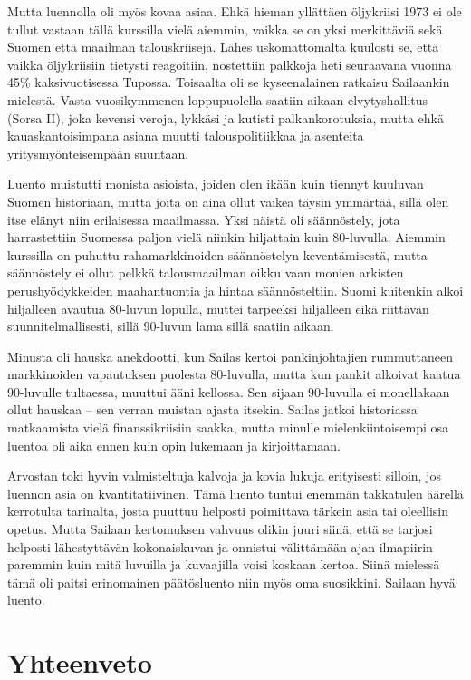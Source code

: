 \documentclass[12pt]{article}
\begin{document}
Mutta luennolla oli myös kovaa asiaa. Ehkä hieman yllättäen öljykriisi 1973 ei ole tullut vastaan tällä kurssilla vielä aiemmin, vaikka se on yksi merkittäviä sekä Suomen että maailman talouskriisejä. Lähes uskomattomalta kuulosti se, että vaikka öljykriisiin tietysti reagoitiin, nostettiin palkkoja heti seuraavana vuonna 45\% kaksivuotisessa Tupossa. Toisaalta oli se kyseenalainen ratkaisu Sailaankin mielestä. Vasta vuosikymmenen loppupuolella saatiin aikaan elvytyshallitus (Sorsa II), joka kevensi veroja, lykkäsi ja kutisti palkankorotuksia, mutta ehkä kauaskantoisimpana asiana muutti talouspolitiikkaa ja asenteita yritysmyönteisempään suuntaan.

Luento muistutti monista asioista, joiden olen ikään kuin tiennyt kuuluvan Suomen historiaan, mutta joita on aina ollut vaikea täysin ymmärtää, sillä olen itse elänyt niin erilaisessa maailmassa. Yksi näistä oli säännöstely, jota harrastettiin Suomessa paljon vielä niinkin hiljattain kuin 80-luvulla. Aiemmin kurssilla on puhuttu rahamarkkinoiden säännöstelyn keventämisestä, mutta säännöstely ei ollut pelkkä talousmaailman oikku vaan monien arkisten perushyödykkeiden maahantuontia ja hintaa säännösteltiin. Suomi kuitenkin alkoi hiljalleen avautua 80-luvun lopulla, muttei tarpeeksi hiljalleen eikä riittävän suunnitelmallisesti, sillä 90-luvun lama sillä saatiin aikaan.

Minusta oli hauska anekdootti, kun Sailas kertoi pankinjohtajien rummuttaneen markkinoiden vapautuksen puolesta 80-luvulla, mutta kun pankit alkoivat kaatua 90-luvulle tultaessa, muuttui ääni kellossa. Sen sijaan 90-luvulla ei monellakaan ollut hauskaa -- sen verran muistan ajasta itsekin. Sailas jatkoi historiassa matkaamista vielä finanssikriisiin saakka, mutta minulle mielenkiintoisempi osa luentoa oli aika ennen kuin opin lukemaan ja kirjoittamaan.

Arvostan toki hyvin valmisteltuja kalvoja ja kovia lukuja erityisesti silloin, jos luennon asia on kvantitatiivinen. Tämä luento tuntui enemmän takkatulen äärellä kerrotulta tarinalta, josta puuttuu helposti poimittava tärkein asia tai oleellisin opetus. Mutta Sailaan kertomuksen vahvuus olikin juuri siinä, että se tarjosi helposti lähestyttävän kokonaiskuvan ja onnistui välittämään ajan ilmapiirin paremmin kuin mitä luvuilla ja kuvaajilla voisi koskaan kertoa. Siinä mielessä tämä oli paitsi erinomainen päätösluento niin myös oma suosikkini. Sailaan hyvä luento.


\newpage
\section{Yhteenveto}
\end{document}

